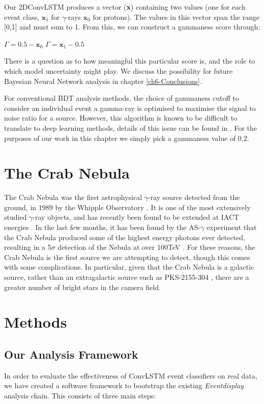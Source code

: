 Our 2DConvLSTM produces a vector (\textbf{x}) containing two values (one for each event class,   $\textbf{x}_1$ for $\gamma$-rays $\textbf{x}_0$ for protons). The values in this vector span the range [0,1] and must sum to 1. From this, we can construct a gammaness score through:

\begin{algorithmic}
    \STATE $\Gamma=0.5-\textbf{x}_0$
    \ELSE
    \STATE $\Gamma=\textbf{x}_1-0.5$
    \ENDIF
\end{algorithmic}
There is a question as to how meaningful this particular score is, and the role to which model uncertainty might play. We discuss the possibility for future Bayesian Neural Network analysis in chapter \ref{ch6-Conclusions}.

For conventional BDT analysis methods, the choice of gammaness cutoff to consider an individual event a gamma-ray is optimised to maximise the signal to noise ratio for a source. However, this algorithm is known to be difficult to translate to deep learning methods, details of this issue can be found in \cite{Shilon}. For the purposes of our work in this chapter we simply pick a gammaness value of 0.2.

\section{The Crab Nebula}
The Crab Nebula was the first astrophysical $\gamma$-ray source detected from the ground, in 1989 by the Whipple Observatory \cite{weekestev}. It is one of the most extensively studied $\gamma$-ray objects, and has recently been found to be extended at IACT energies \cite{holler}. In the last few months, it has been found by the AS-$\gamma$ experiment that the Crab Nebula produced some of the highest energy photons ever detected, resulting in a 5$\sigma$ detection of the Nebula at over 100TeV \cite{asgamma}. For these reasons, the Crab Nebula is the first source we are attempting to detect, though this comes with some complications. In particular, given that the Crab Nebula is a galactic source, rather than an extragalactic source such as PKS-2155-304 \cite{Shilon}, there are a greater number of bright stars in the camera field.

\section{Methods}
\subsection{Our Analysis Framework}
In order to evaluate the effectiveness of ConvLSTM event classifiers on real data, we have created a software framework to bootstrap the existing \textit{Eventdisplay} analysis chain. This consists of three main steps:

